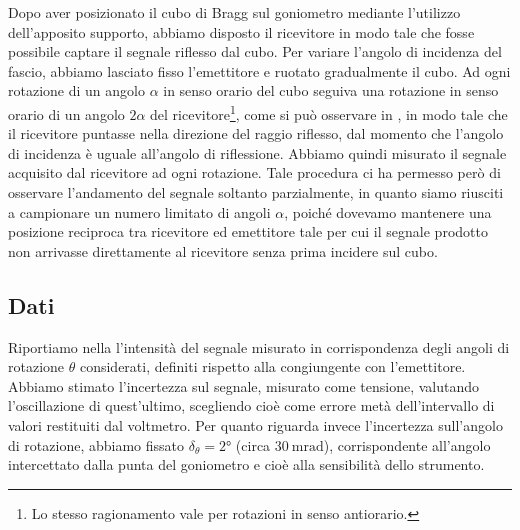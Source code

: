 \documentclass[a4paper]{article}
\begin{document}
Dopo aver posizionato il cubo di Bragg sul goniometro mediante l'utilizzo dell'apposito supporto, abbiamo disposto il ricevitore in modo tale che fosse possibile captare il segnale riflesso dal cubo. Per variare l'angolo di incidenza del fascio, abbiamo lasciato fisso l'emettitore e ruotato gradualmente il cubo. Ad ogni rotazione di un angolo $\alpha$ in senso orario del cubo seguiva una rotazione in senso orario di un angolo $2\alpha$ del ricevitore\footnote{Lo stesso ragionamento vale per rotazioni in senso antiorario.}, come si può osservare in , in modo tale che il ricevitore puntasse nella direzione del raggio riflesso, dal momento che l'angolo di incidenza è uguale all'angolo di riflessione. Abbiamo quindi misurato il segnale acquisito dal ricevitore ad ogni rotazione. Tale procedura ci ha permesso però di osservare l'andamento del segnale soltanto parzialmente, in quanto siamo riusciti a campionare un numero limitato di angoli $\alpha$, poiché dovevamo mantenere una posizione reciproca tra ricevitore ed emettitore tale per cui il segnale prodotto non arrivasse direttamente al ricevitore senza prima incidere sul cubo.

\subsection{Dati}
Riportiamo nella  l'intensità del segnale misurato in corrispondenza degli angoli di rotazione $\theta$ considerati, definiti rispetto
alla congiungente con l'emettitore.
Abbiamo stimato l'incertezza sul segnale, misurato come tensione, valutando l'oscillazione di quest'ultimo, scegliendo cioè come errore metà dell'intervallo di valori restituiti dal voltmetro. Per quanto riguarda invece l'incertezza sull'angolo di rotazione, abbiamo fissato $\delta_{\theta}=\ang{2}$ (circa $\SI{30}{\milli\radian}$), corrispondente all'angolo intercettato dalla punta del goniometro e cioè alla sensibilità dello strumento.
\end{document}
